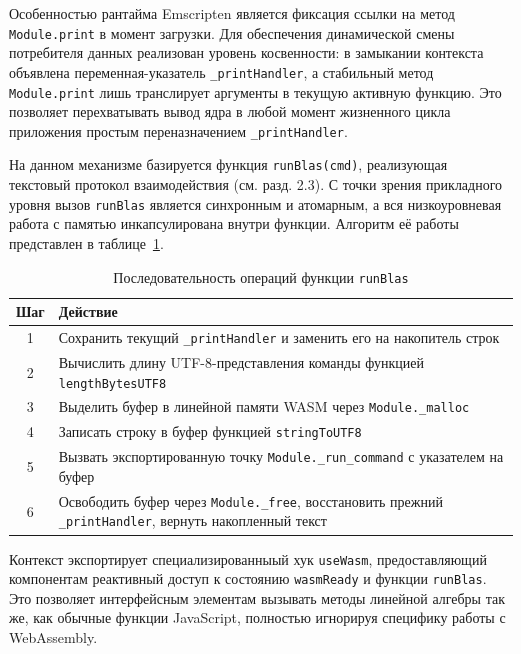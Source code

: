 \documentclass[12pt, oneside]{book}
\begin{document}
  \quad Особенностью рантайма Emscripten является фиксация ссылки на метод \texttt{Module.print} в момент загрузки. Для обеспечения динамической смены потребителя данных реализован уровень косвенности: в замыкании контекста объявлена переменная-указатель \texttt{\_printHandler}, а стабильный метод \texttt{Module.print} лишь транслирует аргументы в текущую активную функцию. Это позволяет перехватывать вывод ядра в любой момент жизненного цикла приложения простым переназначением \texttt{\_printHandler}.

    \quad На данном механизме базируется функция \texttt{runBlas(cmd)}, реализующая текстовый протокол взаимодействия (см. разд. 2.3). С точки зрения прикладного уровня вызов \texttt{runBlas} является синхронным и атомарным, а вся низкоуровневая работа с памятью инкапсулирована внутри функции. Алгоритм её работы представлен в таблице~\ref{tab:runblas_pipeline}.
    
\begin{table}[htbp]
\centering
\scriptsize
\renewcommand{\arraystretch}{1.15}
\begin{tabular}{|c|p{11cm}|}
\hline
\rowcolor{thbg} \textbf{Шаг} & \textbf{Действие} \\
\hline
1 & Сохранить текущий \texttt{\_printHandler} и заменить его на накопитель строк \\
\hline
2 & Вычислить длину UTF-8-представления команды функцией \texttt{lengthBytesUTF8} \\
\hline
3 & Выделить буфер в линейной памяти WASM через \texttt{Module.\_malloc} \\
\hline
4 & Записать строку в буфер функцией \texttt{stringToUTF8} \\
\hline
5 & Вызвать экспортированную точку \texttt{Module.\_run\_command} с указателем на буфер \\
\hline
6 & Освободить буфер через \texttt{Module.\_free}, восстановить прежний \texttt{\_printHandler}, вернуть накопленный текст \\
\hline
\end{tabular}
\caption{Последовательность операций функции \texttt{runBlas}}
\label{tab:runblas_pipeline}
\end{table}

    \quad Контекст экспортирует специализированныый хук \texttt{useWasm}, предоставляющий компонентам реактивный доступ к состоянию \texttt{wasmReady} и функции \texttt{runBlas}. Это позволяет интерфейсным элементам вызывать методы линейной алгебры так же, как обычные функции JavaScript, полностью игнорируя специфику работы с WebAssembly.
\end{document}
